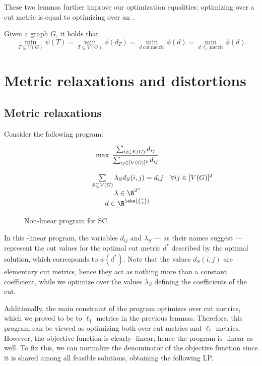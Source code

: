 \documentclass[a4paper, 12pt]{report}
\begin{document}
    These two lemmas further improve our optimization equalities: optimizing over a cut metric is equal to optimizing over an .

    \begin{framedcor}[label={metric cor}]{}
        Given a graph $G$, it holds that $$\min_{T \subseteq V(G)}{\psi(T)} = \min_{T \subseteq V(G)}{\phi(d_T)} = \min_{d \ \mathrm{cut \ metric}}{\phi(d)} = \min_{d \ \ell_1 \ \mathrm{metric}}{\phi(d)}$$
    \end{framedcor}

    \section{Metric relaxations and distortions}

    \subsection{Metric relaxations}

    Consider the following program:

    \begin{figure}[H]
        \centering
        \[\begin{array}{ccl}
            \qquad\qquad\quad
            & \max \; \dfrac{\sum_{ij \in E(G)}{d_{ij}}}{\sum_{ij \in [V(G)]^2}{d_{ij}}} \\\\
            & \sum\limits_{S \subseteq V(G)}{\lambda_Sd_S(i, j)}  = d_ij & \forall ij \in [V(G)]^2 \\
            & \lambda \in \R^{2^n} \\
            & d \in \R^{\abs{\binom{n}{2}}} \\
        \end{array}\]
        \caption{Non-linear program for SC.}
    \end{figure}

    In this -linear program, the variables $d_{ij}$ and $\lambda_S$ --- as their names suggest --- represent the cut values for the optimal cut metric $d^*$ described by the optimal solution, which corresponds to $\phi(d^*)$. Note that the values $d_S(i,j)$ are elementary cut metrics, hence they act as nothing more than a constant coefficient, while we optimize over the values $\lambda_S$ defining the  coefficients of the cut.

    Additionally, the main constraint of the program optimizes over cut metrics, which we proved to be  to $\ell_1$ metrics in the previous lemmas. Therefore, this program can be viewed as optimizing both over cut metrics and $\ell_1$ metrics. However, the objective function is clearly -linear, hence the program is -linear as well. To fix this, we can normalize the denominator of the objective function since it is shared among all feasible solutions, obtaining the following LP.
\end{document}
